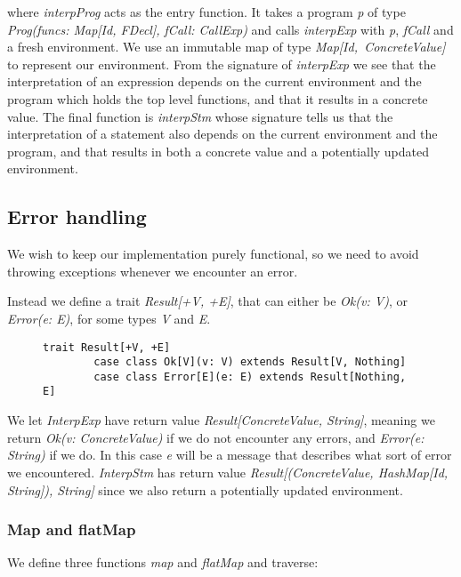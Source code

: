  \noindent where \textsl{interpProg} acts as the entry function. It takes a program \textsl{p} of type \textsl{Prog(funcs: Map[Id, FDecl], fCall: CallExp)} and calls \textsl{interpExp} with \textsl{p}, \textsl{fCall} and a fresh environment. We use an immutable map of type \mbox{\textsl{Map[Id, ConcreteValue]}} to represent our environment. From the signature of \textsl{interpExp} we see that the interpretation of an expression depends on the current environment and the program which holds the top level functions, and that it results in a concrete value. The final function is \textsl{interpStm} whose signature tells us that the interpretation of a statement also depends on the current environment and the program, and that results in both a concrete value and a potentially updated environment. 

\subsection{Error handling}
We wish to keep our implementation purely functional, so we need to avoid throwing exceptions whenever we encounter an error. 

 Instead we define a trait \textsl{Result[+V, +E]}, that can either be \textsl{Ok(v: V)},  or \textsl{Error(e: E)}, for some types \textsl{V} and \textsl{E}.

\begin{figure}[!h]
	\begin{lstlisting}[style=simple]
		trait Result[+V, +E]
		case class Ok[V](v: V) extends Result[V, Nothing]
		case class Error[E](e: E) extends Result[Nothing, E]
	\end{lstlisting}
\end{figure}

We let \textsl{InterpExp} have return value \textsl{Result[ConcreteValue, String]}, meaning we return \textsl{Ok(v: ConcreteValue)} if we do not encounter any errors, and \textsl{Error(e: String)} if we do. In this case \textsl{e} will be a message that describes what sort of error we encountered. \textsl{InterpStm} has return value 
 \textsl{Result[(ConcreteValue, HashMap[Id, String]), String]} since we also return a potentially updated environment. 

\subsubsection{Map and flatMap}

We define three functions \textsl{map} and \textsl{flatMap} and traverse:


